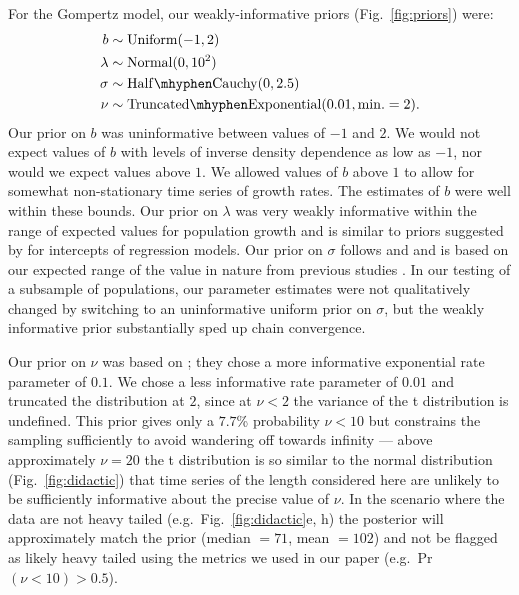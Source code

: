 For the Gompertz model, our weakly-informative priors (Fig.~\ref{fig:priors}) were:
\begin{align*}
b &\sim \mathrm{Uniform}(-1, 2)\\
\lambda &\sim \mathrm{Normal}(0, 10^2)\\
\sigma &\sim \mathrm{Half\mhyphen Cauchy} (0, 2.5)\\
\nu &\sim \mathrm{Truncated\mhyphen Exponential}(0.01, \mathrm{min.} = 2). \end{align*}
Our prior on $b$ was uninformative between values of $-1$ and $2$. We would not
expect values of $b$ with levels of inverse density dependence as low as $-1$,
nor would we expect values above $1$. We allowed values of $b$ above $1$ to
allow for somewhat non-stationary time series of growth rates. The estimates of
$b$ were well within these bounds. Our prior on $\lambda$ was very weakly
informative within the range of expected values for population growth and is
similar to priors suggested by \citet{gelman2008d} for intercepts of regression
models. Our prior on $\sigma$ follows \citet{gelman2006c} and
\citet{gelman2008d} and is based on our expected range of the value in nature
from previous studies \citep[e.g.][]{connors2014}. In our testing of a subsample
of populations, our parameter estimates were not qualitatively changed by
switching to an uninformative uniform prior on $\sigma$, but the weakly
informative prior substantially sped up chain convergence.

Our prior on $\nu$ was based on \citet{fernandez1998}; they chose a more
informative exponential rate parameter of $0.1$. We chose a less informative
rate parameter of $0.01$ and truncated the distribution at $2$, since at $\nu
< 2$ the variance of the t distribution is undefined. This prior gives only
a $7.7$\% probability $\nu < 10$ but constrains the sampling sufficiently to
avoid wandering off towards infinity --- above approximately $\nu = 20$ the
t distribution is so similar to the normal distribution
(Fig.~\ref{fig:didactic}) that time series of the length considered here are
unlikely to be sufficiently informative about the precise value of $\nu$. In the
scenario where the data are not heavy tailed (e.g.~Fig.~\ref{fig:didactic}e, h)
the posterior will approximately match the prior (median $= 71$, mean $= 102$)
and not be flagged as likely heavy tailed using the metrics we used in our paper
(e.g.~Pr$(\nu < 10) > 0.5$).

